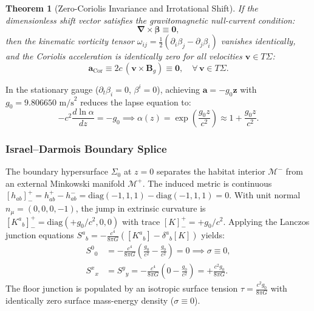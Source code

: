 \documentclass[11pt,onecolumn]{article}
\newtheorem{theorem}{Theorem}
\begin{document}
\begin{theorem}[Zero-Coriolis Invariance and Irrotational Shift]
\label{thm:zero_coriolis}
If the dimensionless shift vector satisfies the gravitomagnetic null-current condition:
\begin{equation}
\boldsymbol{\nabla} \times \boldsymbol{\beta} \equiv \mathbf{0},
\label{eq:null_current_shift}
\end{equation}
then the kinematic vorticity tensor $\omega_{ij} = \frac{1}{2}(\partial_i \beta_j - \partial_j \beta_i)$ vanishes identically, and the Coriolis acceleration is identically zero for all velocities $\mathbf{v} \in T\Sigma$:
\begin{equation}
\mathbf{a}_{\mathrm{Cor}} \equiv 2c\,(\mathbf{v} \times \mathbf{B}_g) \equiv \mathbf{0}, \quad \forall\,\mathbf{v} \in T\Sigma.
\end{equation}
\end{theorem}

In the stationary gauge ($\partial_t \beta_i = 0$, $\beta^i = 0$), achieving $\mathbf{a} = -g_0 \hat{\mathbf{z}}$ with $g_0 = 9.806650\text{ m/s}^2$ reduces the lapse equation to:
\begin{equation}
-c^2 \frac{d\ln\alpha}{dz} = -g_0 \implies \alpha(z) = \exp\left( \frac{g_0 z}{c^2} \right) \approx 1 + \frac{g_0 z}{c^2}.
\label{eq:lapse_solution}
\end{equation}

\subsubsection{Israel--Darmois Boundary Splice}
The boundary hypersurface $\Sigma_0$ at $z = 0$ separates the habitat interior $\mathcal{M}^-$ from an external Minkowski manifold $\mathcal{M}^+$. The induced metric is continuous $[h_{ab}]_-^+ = h_{ab}^+ - h_{ab}^- = \mathrm{diag}(-1, 1, 1) - \mathrm{diag}(-1, 1, 1) = 0$. With unit normal $n_\mu = (0, 0, 0, -1)$, the jump in extrinsic curvature is $[K^a{}_b]_-^+ = \mathrm{diag}(+g_0/c^2, 0, 0)$ with trace $[K]_-^+ = +g_0/c^2$. Applying the Lanczos junction equations $S^a{}_b = -\frac{c^4}{8\pi G}([K^a{}_b] - \delta^a{}_b [K])$ yields:
\begin{align}
S^0{}_0 &= -\frac{c^4}{8\pi G}\left( \frac{g_0}{c^2} - \frac{g_0}{c^2} \right) = 0 \implies \sigma \equiv 0, \\
S^x{}_x &= S^y{}_y = -\frac{c^4}{8\pi G}\left( 0 - \frac{g_0}{c^2} \right) = +\frac{c^2 g_0}{8\pi G}.
\label{eq:boundary_stress}
\end{align}
The floor junction is populated by an isotropic surface tension $\tau = \frac{c^2 g_0}{8\pi G}$ with identically zero surface mass-energy density ($\sigma \equiv 0$).
\end{document}
